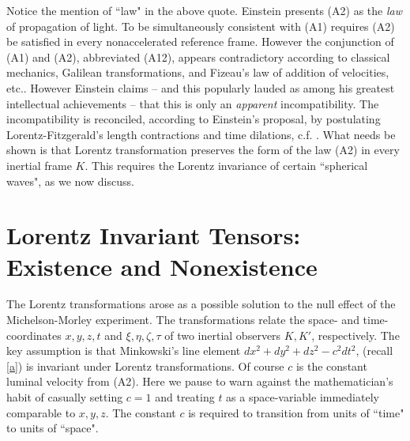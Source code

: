 \documentclass[12pt]{amsart}
\theoremstyle{definition}
\theoremstyle{remark}
\begin{document}
Notice the mention of ``law" in the above quote. Einstein presents (A2) as the \emph{law} of propagation of light. To be simultaneously consistent with (A1) requires (A2) be satisfied in every nonaccelerated reference frame. However the conjunction of (A1) and (A2), abbreviated (A12), appears contradictory according to classical mechanics, Galilean transformations, and Fizeau's law of addition of velocities, etc.. However Einstein claims -- and this popularly lauded as among his greatest intellectual achievements -- that this is only an \emph{apparent} incompatibility. The incompatibility is reconciled, according to Einstein's proposal, by postulating Lorentz-Fitzgerald's length contractions and time dilations, c.f. \cite[Ch.XIV]{michelson}. What needs be shown is that Lorentz transformation preserves the form of the law (A2) in every inertial frame $K$. This requires the Lorentz invariance of certain ``spherical waves", as we now discuss.   








\section{Lorentz Invariant Tensors: Existence and Nonexistence}

The Lorentz transformations arose as a possible solution to the null effect of the Michelson-Morley experiment. The transformations relate the space- and time-coordinates $x,y,z,t$ and $\xi, \eta, \zeta, \tau$ of two inertial observers $K, K'$, respectively. The key assumption is that Minkowski's line element $dx^2+dy^2+dz^2-c^2dt^2$, (recall \eqref{a}) is invariant under Lorentz transformations. Of course $c$ is the constant luminal velocity from (A2). Here we pause to warn against the mathematician's habit of casually setting $c=1$ and treating $t$ as a space-variable immediately comparable to $x,y,z$. The constant $c$ is required to transition from units of ``time" to units of ``space".  %
\end{document}
